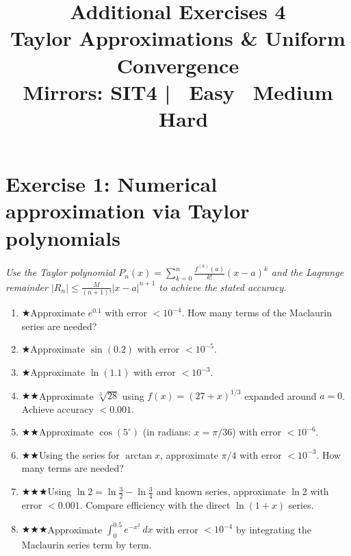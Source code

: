 \documentclass[12pt,a4paper]{article}
\title{\textbf{Additional Exercises 4}\\
\large Taylor Approximations \& Uniform Convergence\\[4pt]
\normalsize Mirrors: SIT4 \quad|\quad
\easy\ Easy \quad \medium\ Medium \quad \hard\ Hard}
\date{}
\newcommand{\easy}{{\color{green!60!black}$\bigstar$}}
\newcommand{\medium}{{\color{orange}$\bigstar\bigstar$}}
\newcommand{\hard}{{\color{red}$\bigstar\bigstar\bigstar$}}
\begin{document}
\maketitle
\thispagestyle{empty}

\section*{Exercise 1: Numerical approximation via Taylor polynomials}

\emph{Use the Taylor polynomial $P_n(x) = \sum_{k=0}^n \frac{f^{(k)}(a)}{k!}(x-a)^k$
and the Lagrange remainder $|R_n| \le \frac{M}{(n+1)!}|x-a|^{n+1}$
to achieve the stated accuracy.}

\begin{enumerate}[leftmargin=*, label=(\alph*)]

\item \easy\quad Approximate $e^{0.1}$ with error $< 10^{-4}$.
How many terms of the Maclaurin series are needed?

\item \easy\quad Approximate $\sin(0.2)$ with error $< 10^{-5}$.

\item \easy\quad Approximate $\ln(1.1)$ with error $< 10^{-3}$.

\item \medium\quad Approximate $\sqrt[3]{28}$ using $f(x)=(27+x)^{1/3}$ expanded around $a=0$.
Achieve accuracy $< 0.001$.

\item \medium\quad Approximate $\cos(5^\circ)$ (in radians: $x = \pi/36$) with error $< 10^{-6}$.

\item \medium\quad Using the series for $\arctan x$, approximate $\pi/4$ with error $< 10^{-3}$.
How many terms are needed?

\item \hard\quad Using $\ln 2 = \ln\frac{3}{2} - \ln\frac{3}{4}$ and known series, approximate
$\ln 2$ with error $< 0.001$. Compare efficiency with the direct $\ln(1+x)$ series.

\item \hard\quad Approximate $\displaystyle\int_0^{0.5} e^{-x^2}\,dx$ with error $< 10^{-4}$
by integrating the Maclaurin series term by term.

\end{enumerate}
\end{document}
